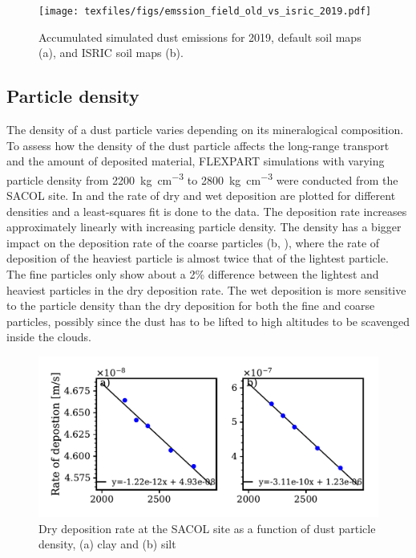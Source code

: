 \begin{figure}[htpb]
    \centering
    \texttt{[image: texfiles/figs/emssion\_field\_old\_vs\_isric\_2019.pdf]}
    \caption{Accumulated simulated dust emissions for 2019, default soil maps (a), and ISRIC soil maps (b).}
    \label{fig:emissions_ISRIC_old_com}
\end{figure}
\subsection{Particle density}\label{sec:density_experiment}
The density of a dust particle varies depending on its mineralogical composition. 
To assess how the density of the dust particle affects the long-range transport and the amount of deposited material,
FLEXPART simulations with varying particle density from \SI{2200}{\kg\per\cubic\cm} to \SI{2800}{\kg\per\cubic\cm}  were conducted from the SACOL site. 
In  and  the rate of dry and wet deposition are plotted for different densities and a least-squares fit is done to the data. 
The deposition rate increases approximately linearly with increasing particle density. 
The density has a bigger impact on the deposition rate of the coarse particles (b, ), where the rate of deposition of the heaviest particle is almost twice that of the lightest particle. 
The fine particles only show about a 2\% difference between the lightest and heaviest particles in the dry deposition rate. 
The wet deposition is more sensitive to the particle density than the dry deposition for both the fine and coarse particles, possibly since the dust has to be lifted to high altitudes to be scavenged inside the clouds. 
\begin{figure}[hptb]
    \centering
    \includegraphics[width=\textwidth]{texfiles/figs/drydep_function_of_density.pdf}
    \caption{Dry deposition rate at the SACOL site as a function of dust particle density, (a) clay and (b) silt}
    \label{fig:dry_dep_density}
\end{figure}

